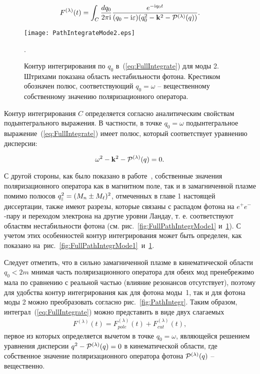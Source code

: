 \begin{equation}\label{eq:FullIntegrate}
	F^{(\lambda)}(t)=\int_C\frac{dq_0}{2\pi \ii}\frac{e^{-\ii q_0 t}}{(q_0-\ii \varepsilon)(q_0^2-\vec{k}^2-{\cal P}^{(\lambda)}(q))}.
\end{equation}

	\begin{figure}[t]\centering
		\texttt{[image: PathIntegrateMode2.eps]}
		\caption{Контур интегрирования по $q_0$ в~(\ref{eq:FullIntegrate}) для моды 2. Штрихами показана область нестабильности фотона. Крестиком обозначен полюс, соответствующий $q_0=\omega$ -- вещественному собственному значению поляризационного оператора.}\label{fig:FullPathIntegr}.
	\end{figure}

Контур интегрирования $C$ определяется согласно аналитическим свойствам подынтегрального выражения. В частности, в точке $q_0=\omega$ подынтегральное выражение~(\ref{eq:FullIntegrate}) имеет полюс, который соответствует уравнению дисперсии:

\begin{equation}
	\omega^2 - \vec{k}^2 - {\cal P^{(\lambda)}}(q)=0.
\end{equation}

С другой стороны, как было показано в работе~\cite{MikhChist:2001}, собственные значения поляризационного оператора как в магнитном поле, так и в замагниченной плазме помимо полюсов $q_{\mprl}^2=(M_n\pm M_\ell)^2$, отмеченных в главе 1 настоящей диссертации, также имеют разрезы, которые связаны с распадом фотона на $e^+e^-$-пару и переходом электрона на другие уровни Ландау, т. е. соответствуют областям нестабильности фотона (см. рис.~\ref{fig:FullPathIntegrMode1} и~\ref{fig:FullPathIntegr}). С учетом этих особенностей  контур интегрирования может быть определен, как показано на~рис.~\ref{fig:FullPathIntegrMode1}~и~\ref{fig:FullPathIntegr}.

Следует отметить, что в сильно замагниченной плазме в кинематической области $q_0<2m$ мнимая часть поляризационного оператора для обеих мод пренебрежимо мала по сравнению с реальной частью (влияние резонансов отсутствует), поэтому для удобства контур интегрирования как для фотона моды~1, так и для фотона моды 2 можно преобразовать согласно рис.~\ref{fig:PathIntegr}. Таким образом, интеграл~(\ref{eq:FullIntegrate}) можно представить в виде двух слагаемых
\begin{eqnarray}
F^{(\lambda)}(t) = F^{(\lambda)}_{pole}(t) + F^{(\lambda)}_{cut}(t),
\label{eq:19}
\end{eqnarray}
%
первое из которых определяется вычетом в точке $q_0 = \omega$, являющейся
решением уравнения дисперсии $q^2 - {\cal P}^{(\lambda)}(q) = 0$ в кинематической области, где собственное 
значение поляризационного оператора фотона ${\cal P}^{(\lambda)}(q)$ -- вещественно. 

